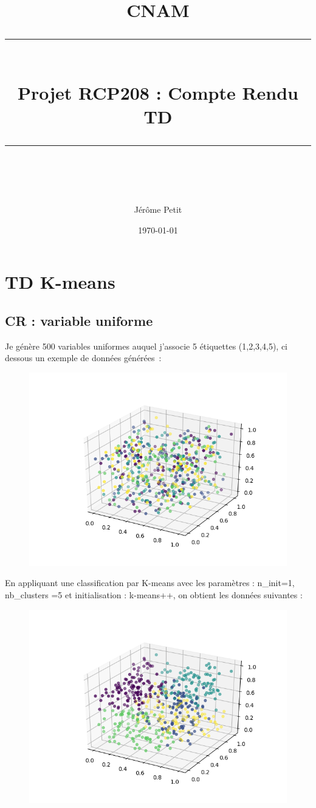 \documentclass[12pt]{scrartcl} %
\title{	
	\normalfont\normalsize
	\textsc{CNAM}\\ %
	\vspace{25pt} %
	\rule{\linewidth}{0.5pt}\\ %
	\vspace{20pt} %
	{\huge Projet RCP208 : Compte Rendu TD}\\ %
	\vspace{12pt} %
	\rule{\linewidth}{2pt}\\ %
	\vspace{12pt} %
}
\author{\LARGE Jérôme Petit} %
\date{\normalsize\today} %
\begin{document}
\maketitle %


\section{TD K-means}
\subsection{CR : variable uniforme}
Je génère 500 variables uniformes auquel j'associe 5 étiquettes (1,2,3,4,5), ci dessous un exemple de données générées~:
\newline
\begin{figure}[!h]
 \centering 
\includegraphics[scale=.5]{uniform.png}
\end{figure}
\newline
En appliquant une classification par K-means avec les paramètres : n\_init=1, nb\_clusters =5 et initialisation : k-means++, on obtient les données suivantes : 
\newline
\begin{figure}[!h]
 \centering 
\includegraphics[scale=.5]{uniformKmeans.png}
\end{figure}
\end{document}
